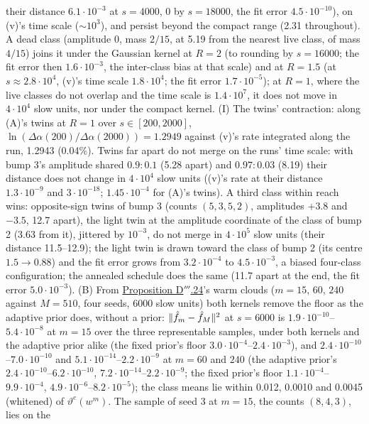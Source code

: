 \begin{sloppypar}
their distance $6.1\cdot10^{-3}$ at $s = 4000$, 0 by $s = 18000$, the fit error $4.5\cdot10^{-10}$), on (v)'s time
scale (${\sim}10^3$), and persist beyond the compact range (2.31 throughout). A dead class (amplitude 0, mass $2/15$,
at 5.19 from the nearest live class, of mass $4/15$) joins it under the Gaussian kernel at $R = 2$ (to rounding by
$s = 16000$; the fit error then $1.6\cdot10^{-3}$, the inter-class bias at that scale) and at $R = 1.5$ (at
$s\approx2.8\cdot10^4$, (v)'s time scale $1.8\cdot10^4$; the fit error $1.7\cdot10^{-5}$); at $R = 1$, where the live
classes do not overlap and the time scale is $1.4\cdot10^7$, it does not move in $4\cdot10^4$ slow units, nor under
the compact kernel. (I) The twins' contraction: along (A)'s twins at $R = 1$ over $s\in[200,2000]$,
$\ln(\Delta\alpha(200)/\Delta\alpha(2000)) = 1.2949$ against (v)'s rate integrated along the run, 1.2943 (0.04\%).
Twins far apart do not merge on the runs' time scale: with bump 3's amplitude shared $0.9 : 0.1$ (5.28 apart) and
$0.97 : 0.03$ (8.19) their distance does not change in $4\cdot10^4$ slow units ((v)'s rate at their distance
$1.3\cdot10^{-9}$ and $3\cdot10^{-18}$; $1.45\cdot10^{-4}$ for (A)'s twins). A third class within reach wins:
opposite-sign twins of bump 3 (counts $(5,3,5,2)$, amplitudes $+3.8$ and $-3.5$, 12.7 apart), the light twin at the
amplitude coordinate of the class of bump 2 (3.63 from it), jittered by $10^{-3}$, do not merge in $4\cdot10^5$ slow
units (their distance 11.5--12.9); the light twin is drawn toward the class of bump 2 (its centre $1.5\to0.88$) and
the fit error grows from $3.2\cdot10^{-4}$ to $4.5\cdot10^{-3}$, a biased four-class configuration; the annealed
schedule does the same (11.7 apart at the end, the fit error $5.0\cdot10^{-3}$). (B) From
\hyperref[res:thmDppp:24]{Proposition D$'''$.24}'s warm clouds ($m = 15$, $60$, $240$ against $M = 510$, four seeds,
6000 slow units) both kernels remove the floor as the adaptive prior does, without a prior:
$\lVert \hat f_m - \hat f_M\rVert^2$ at $s = 6000$ is $1.9\cdot10^{-10}$--$5.4\cdot10^{-8}$ at $m = 15$ over the three
representable samples, under both kernels and the adaptive prior alike (the fixed prior's floor
$3.0\cdot10^{-4}$--$2.4\cdot10^{-3}$), and $2.4\cdot10^{-10}$--$7.0\cdot10^{-10}$ and
$5.1\cdot10^{-14}$--$2.2\cdot10^{-9}$ at $m = 60$ and $240$ (the adaptive prior's
$2.4\cdot10^{-10}$--$6.2\cdot10^{-10}$, $7.2\cdot10^{-14}$--$2.2\cdot10^{-9}$; the fixed prior's floor
$1.1\cdot10^{-4}$--$9.9\cdot10^{-4}$, $4.9\cdot10^{-6}$--$8.2\cdot10^{-5}$); the class means lie within 0.012, 0.0010
and 0.0045 (whitened) of $\vartheta^e(w^m)$. The sample of seed 3 at $m = 15$, the counts $(8,4,3)$, lies on the

\end{sloppypar}

